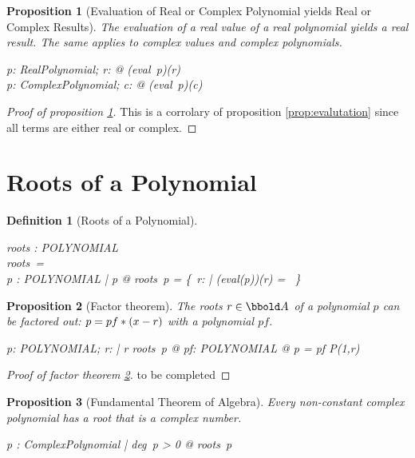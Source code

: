 \documentclass[12pt]{scrartcl}
\newtheorem{prop}{Proposition}[section]
\newtheorem{zdef}{Definition}[section]
\begin{document}
%
\begin{prop}[Evaluation of Real or Complex Polynomial yields Real or Complex Results]
  \label{prop:evaluation-real-complex-polynomial}
  The evaluation of a real value of a real polynomial yields a real
  result. The same applies to complex values and complex polynomials.
  \begin{zed}
    \forall p: RealPolynomial; r: \real @ (eval~p)(r) \in \real\\
    \forall p: ComplexPolynomial; c: \complex @ (eval~p)(c) \in \complex\\
  \end{zed}
\end{prop}
\begin{proof}[Proof of proposition \ref{prop:evaluation-real-complex-polynomial}]
  This is a corrolary of proposition \ref{prop:evalutation} since all
  terms are either real or complex.
\end{proof}

%
\section{Roots of a Polynomial}
\label{sec:roots}


\begin{zdef}[Roots of a Polynomial]
  \label{zdef:roots}
  \begin{axdef}
    roots : POLYNOMIAL \fun \power \arithmos\\
    \where
    roots~\zeropol = \arithmos\\
    \forall p : POLYNOMIAL | p \neq \zeropol @ roots~p = \{~r: \arithmos |
    (eval(p))(r) = \azero~\}
  \end{axdef}
\end{zdef}

\begin{prop}[Factor theorem]
  \label{prop:factor-theorem}
  The roots $r \in \arithmos$ of a polynomial $p$ can be factored out: $p
  = pf * (x-r)$ with a polynomial $pf$.
  \begin{zed}
    \forall p: POLYNOMIAL; r: \arithmos | r \in roots~p @ \exists pf: POLYNOMIAL @ p =
    pf \polymult P(1,r)
  \end{zed}
\end{prop}
\begin{proof}[Proof of factor theorem \ref{prop:factor-theorem}]
  to be completed
\end{proof}
%
\begin{prop}[Fundamental Theorem of Algebra]
  Every non-constant complex polynomial has a root that is a complex
  number.
  \begin{zed}
    \forall p : ComplexPolynomial | deg~p > 0 @ roots~p \cap \complex
    \neq \emptyset
  \end{zed}
\end{prop}
%
\printbibliography{}

\end{document}
